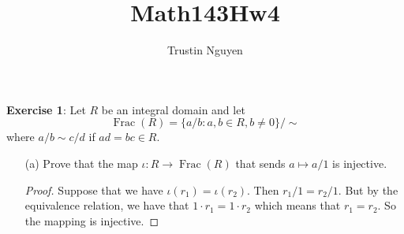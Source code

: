 \documentclass{article}
\title{Math143Hw4}
\author{Trustin Nguyen}
\begin{document}
    \maketitle

\reversemarginpar

\textbf{Exercise 1}: Let $R$ be an integral domain and let
    \begin{equation*}
        \mathop{Frac}(R) = \{a / b : a, b \in R, b \neq 0\}/ \sim 
    \end{equation*}
where $a/b \sim  c/ d$ if $ad = bc \in R$.
    \begin{itemize}
        \item [(a)] Prove that the map $\iota: R \rightarrow \mathop{Frac}(R)$ that sends $a \mapsto a/1$ is injective.
            \begin{proof}
                Suppose that we have $\iota(r_{1}) = \iota(r_{2})$. Then $r_{1}/1 = r_{2}/1$. But by the equivalence relation, we have that $1 \cdot r_{1} = 1 \cdot r_{2}$ which means that $r_{1} = r_{2}$. So the mapping is injective.
            \end{proof}


\end{itemize}
\end{document}
